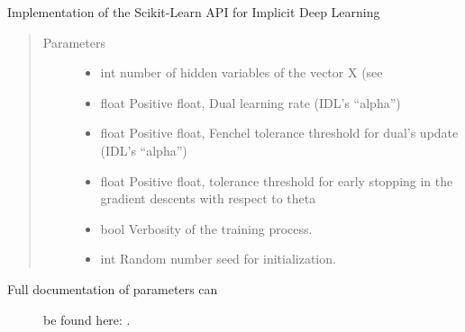 \documentclass[letterpaper,10pt,english]{sphinxmanual}
\begin{document}
\begin{fulllineitems}
\label{\detokenize{sections/learning:IDL.IDLModel}}
Implementation of the Scikit-Learn API for Implicit Deep Learning
\begin{quote}\begin{description}
\item[{Parameters}] \leavevmode\begin{itemize}
\item {} 
 \textendash{} int
number of hidden variables of the vector X (see

\item {} 
 \textendash{} float
Positive float, Dual learning rate (IDL’s “alpha”)

\item {} 
 \textendash{} float
Positive float, Fenchel tolerance threshold for dual’s update (IDL’s “alpha”)

\item {} 
 \textendash{} float
Positive float, tolerance threshold for early stopping in the gradient descents with respect to theta

\item {} 
 \textendash{} bool
Verbosity of the training process.

\item {} 
 \textendash{} int
Random number seed for initialization.

\end{itemize}

\end{description}\end{quote}
\begin{description}
\item[{Full documentation of parameters can}] \leavevmode
be found here: .


\end{description}
\end{fulllineitems}
\end{document}
